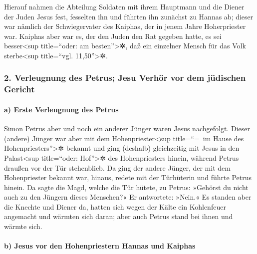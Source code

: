  Hierauf nahmen die Abteilung Soldaten mit ihrem
Hauptmann und die Diener der Juden Jesus fest, fesselten ihn
 und führten ihn zunächst zu Hannas ab; dieser war
nämlich der Schwiegervater des Kaiphas, der in jenem Jahre Hoherpriester
war.  Kaiphas aber war es, der den Juden den Rat gegeben
hatte, es sei besser\textless sup title=``oder: am
besten''\textgreater✲, daß ein einzelner Mensch für das Volk
sterbe\textless sup title=``vgl. 11,50''\textgreater✲.

\hypertarget{verleugnung-des-petrus-jesu-verhuxf6r-vor-dem-juxfcdischen-gericht}{%
\subsubsection{2. Verleugnung des Petrus; Jesu Verhör vor dem jüdischen
Gericht}\label{verleugnung-des-petrus-jesu-verhuxf6r-vor-dem-juxfcdischen-gericht}}

\hypertarget{a-erste-verleugnung-des-petrus}{%
\paragraph{a) Erste Verleugnung des
Petrus}\label{a-erste-verleugnung-des-petrus}}

 Simon Petrus aber und noch ein anderer Jünger waren
Jesus nachgefolgt. Dieser (andere) Jünger war aber mit dem
Hohenpriester\textless sup title=``=~im Hause des
Hohenpriesters''\textgreater✲ bekannt und ging (deshalb) gleichzeitig
mit Jesus in den Palast\textless sup title=``oder: Hof''\textgreater✲
des Hohenpriesters hinein,  während Petrus draußen vor
der Tür stehenblieb. Da ging der andere Jünger, der mit dem
Hohenpriester bekannt war, hinaus, redete mit der Türhüterin und führte
Petrus hinein.  Da sagte die Magd, welche die Tür hütete,
zu Petrus: »Gehörst du nicht auch zu den Jüngern dieses Menschen?« Er
antwortete: »Nein.«  Es standen aber die Knechte und
Diener da, hatten sich wegen der Kälte ein Kohlenfeuer angemacht und
wärmten sich daran; aber auch Petrus stand bei ihnen und wärmte sich.

\hypertarget{b-jesus-vor-den-hohenpriestern-hannas-und-kaiphas}{%
\paragraph{b) Jesus vor den Hohenpriestern Hannas und
Kaiphas}\label{b-jesus-vor-den-hohenpriestern-hannas-und-kaiphas}}

